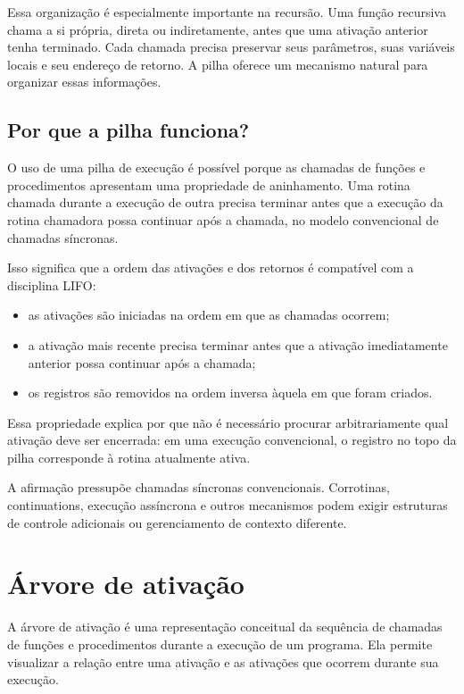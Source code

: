 \documentclass[
  brazilian,
  letterpaper,
]{book}
\providecommand{\tightlist}{%
  \setlength{\itemsep}{0pt}\setlength{\parskip}{0pt}}
\theoremstyle{plain}
\theoremstyle{definition}
\theoremstyle{remark}
\begin{document}
Essa organização é especialmente importante na recursão. Uma função
recursiva chama a si própria, direta ou indiretamente, antes que uma
ativação anterior tenha terminado. Cada chamada precisa preservar seus
parâmetros, suas variáveis locais e seu endereço de retorno. A pilha
oferece um mecanismo natural para organizar essas informações.

\subsection{Por que a pilha funciona?}\label{por-que-a-pilha-funciona}

O uso de uma pilha de execução é possível porque as chamadas de funções
e procedimentos apresentam uma propriedade de aninhamento. Uma rotina
chamada durante a execução de outra precisa terminar antes que a
execução da rotina chamadora possa continuar após a chamada, no modelo
convencional de chamadas síncronas.

Isso significa que a ordem das ativações e dos retornos é compatível com
a disciplina LIFO:

\begin{itemize}
\tightlist
\item
  as ativações são iniciadas na ordem em que as chamadas ocorrem;
\item
  a ativação mais recente precisa terminar antes que a ativação
  imediatamente anterior possa continuar após a chamada;
\item
  os registros são removidos na ordem inversa àquela em que foram
  criados.
\end{itemize}

Essa propriedade explica por que não é necessário procurar
arbitrariamente qual ativação deve ser encerrada: em uma execução
convencional, o registro no topo da pilha corresponde à rotina
atualmente ativa.

A afirmação pressupõe chamadas síncronas convencionais. Corrotinas,
continuations, execução assíncrona e outros mecanismos podem exigir
estruturas de controle adicionais ou gerenciamento de contexto
diferente.

\section{Árvore de ativação}\label{uxe1rvore-de-ativauxe7uxe3o}

A árvore de ativação é uma representação conceitual da sequência de
chamadas de funções e procedimentos durante a execução de um programa.
Ela permite visualizar a relação entre uma ativação e as ativações que
ocorrem durante sua execução.
\end{document}
